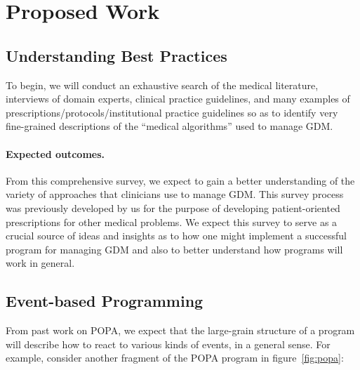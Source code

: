 \section{Proposed Work}

\addtocounter{subsection}{-1}
\subsection{Understanding Best Practices}\label{sec:best-practices}

To begin, we will conduct an exhaustive search of the medical
literature, interviews of domain experts, clinical practice
guidelines, and many examples of prescriptions/protocols/institutional
practice guidelines so as to identify very fine-grained descriptions
of the ``medical algorithms'' used to manage GDM.

\paragraph{Expected outcomes.}
From this comprehensive survey, we expect to gain a better
understanding of the variety of approaches that clinicians use to
manage GDM. This survey process was previously developed by us for the
purpose of developing patient-oriented prescriptions for other medical
problems.  We expect this survey to serve as a crucial source of ideas
and insights as to how one might implement a successful \poppl{}
program for managing GDM and also to better understand how \poppl{}
programs will work in general.

\subsection{Event-based Programming}\label{sec:new-start}\label{sec:event}

From past work on POPA, we expect that the large-grain structure of a
\poppl{} program will describe how to react to various kinds of
events, in a general sense.  For example, consider another fragment of
the POPA program in figure~\ref{fig:popa}:
\begin{center}
\end{center}

